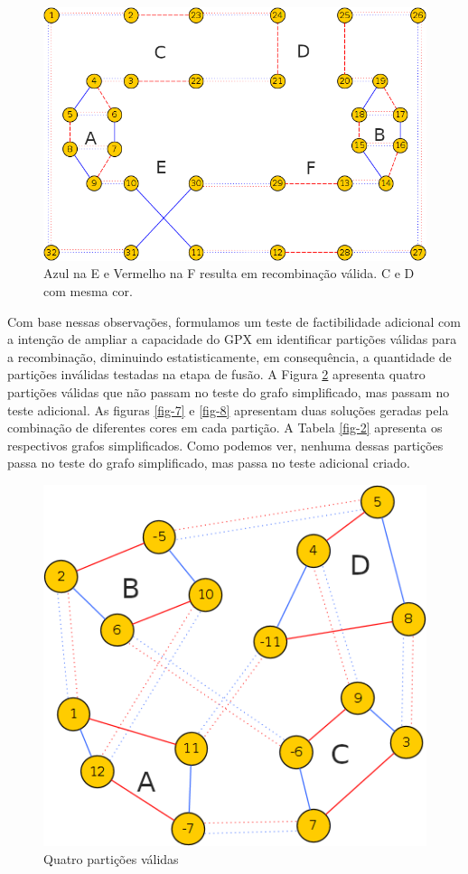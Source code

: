 \documentclass[
	article,			%
	11pt,				%
	oneside,			%
	a4paper,			%
	english,			%
	brazil,				%
	sumario=tradicional
	]{abntex2}
\begin{document}
\begin{figure}[tbph!]
	\centering
	\includegraphics[width=0.7\linewidth]{fig-5}
	\caption{Azul na E e Vermelho na F resulta em recombinação válida. C e D com mesma cor.}
	\label{fig-5}
\end{figure}

Com base nessas observações, formulamos um teste de factibilidade adicional com a intenção de ampliar a capacidade do GPX em identificar partições válidas para a recombinação, diminuindo estatisticamente, em consequência, a quantidade de partições inválidas testadas na etapa de fusão. A Figura \ref{fig-6} apresenta quatro partições válidas que não passam no teste do grafo simplificado, mas passam no teste adicional. As figuras \ref{fig-7} e \ref{fig-8} apresentam duas soluções geradas pela combinação de diferentes cores em cada partição. A Tabela \ref{fig-2} apresenta os respectivos grafos simplificados. Como podemos ver, nenhuma dessas partições passa no teste do grafo simplificado, mas passa no teste adicional criado.

\begin{figure}[tbph!]
	\centering
	\includegraphics[width=0.5\linewidth]{fig-6}
	\caption{Quatro partições válidas}
	\label{fig-6}
\end{figure}
\end{document}
